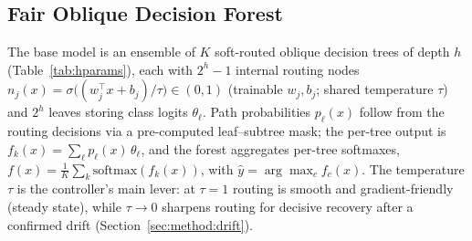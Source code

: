 \documentclass[sigconf,anonymous,review]{acmart}
\begin{document}
\subsection{Fair Oblique Decision Forest}
\label{sec:method:model}
The base model is an ensemble of $K$ soft-routed oblique decision trees of depth $h$ (Table~\ref{tab:hparams}), each with $2^{h}{-}1$ internal routing nodes
$n_j(x) = \sigma\!\big((w_j^{\top} x + b_j)/\tau\big) \in (0,1)$ (trainable $w_j,b_j$; shared temperature $\tau$) and $2^{h}$ leaves storing class logits $\theta_\ell$. Path
probabilities $p_\ell(x)$ follow from the routing decisions via a pre-computed leaf--subtree mask; the per-tree output is $f_k(x) = \sum_\ell p_\ell(x)\,\theta_\ell$, and the
forest aggregates per-tree softmaxes, $f(x) = \tfrac{1}{K}\sum_{k} \mathrm{softmax}(f_k(x))$, with $\hat{y} = \arg\max_c f_c(x)$. The temperature $\tau$ is the controller's
main lever: at $\tau{=}1$ routing is smooth and gradient-friendly (steady state), while $\tau\!\to\!0$ sharpens routing for decisive recovery after a confirmed drift
(Section~\ref{sec:method:drift}).
\end{document}
